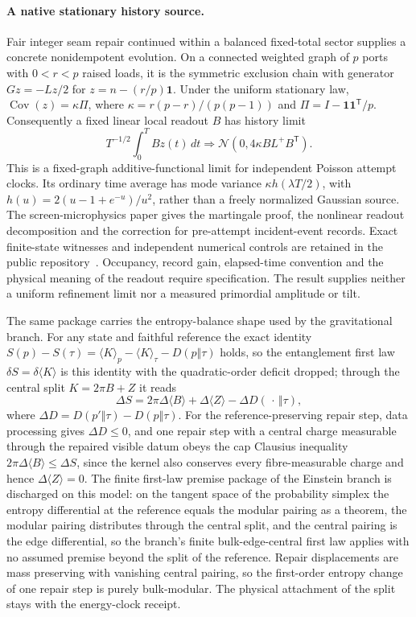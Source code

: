 \documentclass[11pt]{article}
\begin{document}




\paragraph{A native stationary history source.}
Fair integer seam repair continued within a balanced fixed-total sector
supplies a concrete nonidempotent evolution. On a connected weighted graph
of $p$ ports with $0<r<p$ raised loads, it is the symmetric exclusion chain
with generator $Gz=-Lz/2$ for $z=n-(r/p)\mathbf1$. Under the uniform
stationary law, $\operatorname{Cov}(z)=\kappa\Pi$, where
$\kappa=r(p-r)/(p(p-1))$ and $\Pi=I-\mathbf1\mathbf1^\mathsf T/p$.
Consequently a fixed linear local readout $B$ has history limit
\[
 T^{-1/2}\int_0^T Bz(t)\,dt
 \Longrightarrow \mathcal N(0,4\kappa BL^+B^\mathsf T).
\]
This is a fixed-graph additive-functional limit for independent Poisson
attempt clocks. Its ordinary time average has mode variance
$\kappa h(\lambda T/2)$, with
$h(u)=2(u-1+e^{-u})/u^2$, rather than a freely normalized Gaussian source.
The screen-microphysics paper gives the martingale proof, the nonlinear
readout decomposition and the correction for pre-attempt incident-event
records. Exact finite-state witnesses and independent numerical controls
are retained in the public repository~\cite{ophrepo}.
Occupancy, record gain, elapsed-time convention and the physical meaning of
the readout require specification. The result supplies neither a uniform
refinement limit nor a measured primordial amplitude or tilt.

The same package carries the entropy-balance shape used by the
gravitational branch. For any state and faithful reference the exact
identity
\(S(p)-S(\tau)=\langle K\rangle_p-\langle K\rangle_\tau-D(p\Vert\tau)\)
holds, so the entanglement first law
\(\delta S=\delta\langle K\rangle\) is this identity with the
quadratic-order deficit dropped; through the central split
\(K=2\pi B+Z\) it reads
\[
\Delta S
=2\pi\Delta\langle B\rangle+\Delta\langle Z\rangle
-\Delta D(\,\cdot\,\Vert\tau),
\]
where \(\Delta D=D(p'\Vert\tau)-D(p\Vert\tau)\). For the
reference-preserving repair step, data processing gives \(\Delta D\le0\), and
one repair step with a central charge measurable through the repaired
visible datum obeys the cap Clausius inequality
\(2\pi\Delta\langle B\rangle\le\Delta S\), since the kernel also conserves
every fibre-measurable charge and hence \(\Delta\langle Z\rangle=0\). The finite
first-law premise package of the Einstein branch is discharged on this
model: on the tangent space of the probability simplex the entropy
differential at the reference equals the modular pairing as a theorem,
the modular pairing distributes through the central split, and the
central pairing is the edge differential, so the branch's finite
bulk-edge-central first law applies with no assumed premise beyond the
split of the reference. Repair displacements are mass preserving with
vanishing central pairing, so the first-order entropy change of one
repair step is purely bulk-modular. The physical attachment of the
split stays with the energy-clock receipt.
\end{document}
